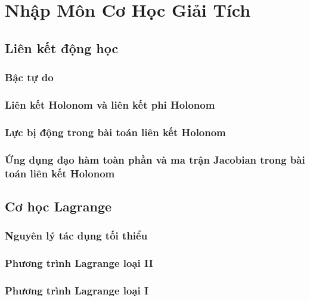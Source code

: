   
\chapter{Nhập Môn Cơ Học Giải Tích}

\section{Liên kết động học}

\subsection{Bậc tự do}

\subsection{Liên kết Holonom và liên kết phi Holonom}

\subsection{Lực bị động trong bài toán liên kết Holonom}

\subsection{Ứng dụng đạo hàm toàn phần và ma trận Jacobian trong bài toán liên kết Holonom}

\section{Cơ học Lagrange}

\subsection{Nguyên lý tác dụng tối thiểu}

\subsection{Phương trình Lagrange loại II}

\subsection{Phương trình Lagrange loại I}

